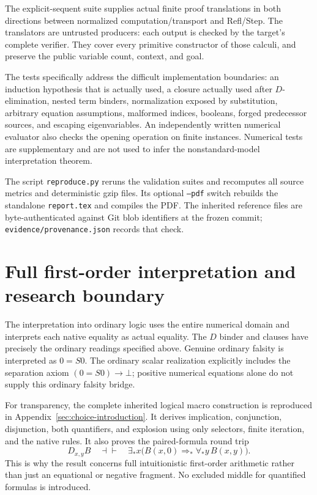 \documentclass[11pt,letterpaper]{article}
\theoremstyle{definition}
\begin{document}
The explicit-sequent suite supplies actual finite proof translations
in both directions between normalized computation/transport and
Refl/Step. The translators are untrusted producers: each output is
checked by the target's complete verifier. They cover every primitive
constructor of those calculi, and preserve the public variable count,
context, and goal.

The tests specifically address the difficult implementation boundaries:
an induction hypothesis that is actually used, a closure actually
used after \(D\)-elimination, nested term binders, normalization
exposed by substitution, arbitrary equation assumptions, malformed
indices, booleans, forged predecessor sources, and escaping
eigenvariables. An independently written numerical evaluator also
checks the opening operation on finite instances. Numerical tests
are supplementary and are not used to infer the nonstandard-model
interpretation theorem.

The script \texttt{reproduce.py} reruns the validation suites and
recomputes all source metrics and deterministic gzip files.
Its optional \texttt{--pdf} switch rebuilds the standalone
\texttt{report.tex} and compiles the PDF. The inherited reference
files are byte-authenticated against Git blob identifiers at the
frozen commit; \texttt{evidence/provenance.json} records that check.

\section{Full first-order interpretation and research boundary}
\label{sec:interpretation-summary}

The interpretation into ordinary logic uses the entire numerical
domain and interprets each native equality as actual equality.
The \(D\) binder and clauses have precisely the ordinary readings
specified above. Genuine ordinary falsity is interpreted as \(0=S0\).
The ordinary scalar realization explicitly includes the separation
axiom \((0=S0)\to\bot\); positive numerical equations alone do not
supply this ordinary falsity bridge.

For transparency, the complete inherited logical macro construction
is reproduced in Appendix~\ref{sec:choice-introduction}.
It derives implication, conjunction, disjunction, both quantifiers,
and explosion using only selectors, finite iteration, and the
native rules. It also proves the paired-formula round trip
\[
 D_{x,y}B
 \quad\dashv\vdash\quad
 \exists_*x\bigl(B(x,0)\Rightarrow_*\forall_*y\,B(x,y)\bigr).
\]
This is why the result concerns full intuitionistic first-order
arithmetic rather than just an equational or negative fragment.
No excluded middle for quantified formulas is introduced.
\end{document}
